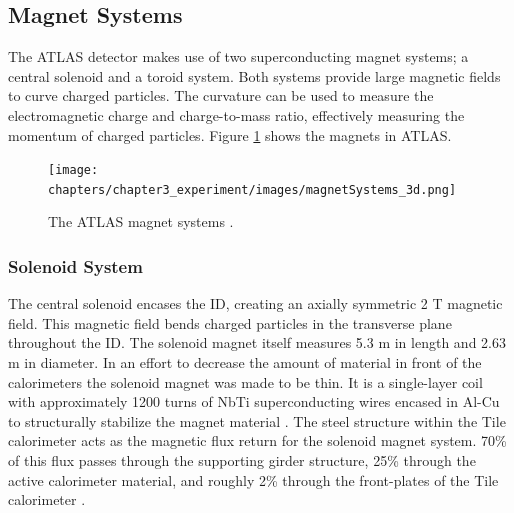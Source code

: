	\subsection{Magnet Systems}\label{ssec:magnets}
	The \gls{ATLAS} detector makes use of two superconducting magnet systems; a central solenoid and a toroid system. Both systems provide large magnetic fields to curve charged particles. The curvature can be used to measure the electromagnetic charge and charge-to-mass ratio, effectively measuring the momentum of charged particles. Figure \ref{fig:ATLAS-magnets} shows the magnets in \gls{ATLAS}.

	\begin{figure}[!ht]
	\centering
	\texttt{[image: chapters/chapter3\_experiment/images/magnetSystems\_3d.png]}
	\caption{ The ATLAS magnet systems \cite{atlas-schematics}.}
	\label{fig:ATLAS-magnets}
	\end{figure}

	\subsubsection{Solenoid System}\label{sssec:solenoid}
		The central solenoid encases the \gls{ID}, creating an axially symmetric 2 T magnetic field. This magnetic field bends charged particles in the transverse plane throughout the \gls{ID}. The solenoid magnet itself measures 5.3 m in length and 2.63 m in diameter. In an effort to decrease the amount of material in front of the calorimeters the solenoid magnet was made to be thin. It is a single-layer coil with approximately 1200 turns of NbTi superconducting wires encased in Al-Cu to structurally stabilize the magnet material \cite{atlas-solenoid}. The steel structure within the Tile calorimeter acts as the magnetic flux return for the solenoid magnet system. 70\% of this flux passes through the supporting girder structure, 25\% through the active calorimeter material, and roughly 2\% through the front-plates of the Tile calorimeter \cite{ATLAS-tile}.

